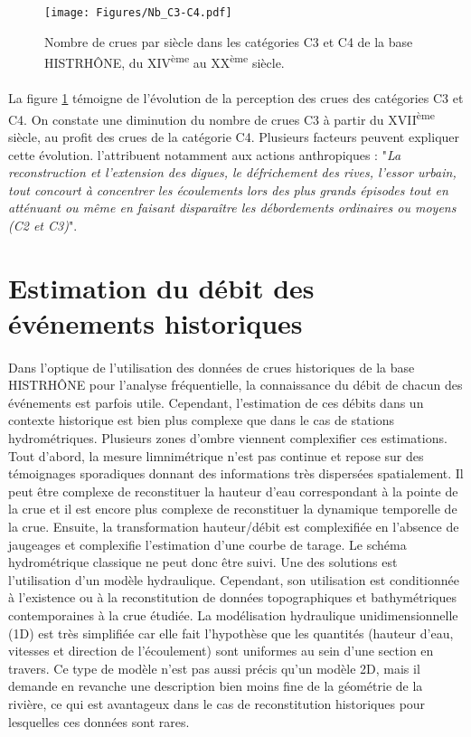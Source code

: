 \documentclass[11pt]{article}
\begin{document}
	\begin{figure}[h]
	\centering
		\texttt{[image: Figures/Nb\_C3-C4.pdf]}
        \caption{Nombre de crues par siècle dans les catégories C3 et C4 de la base HISTRHÔNE, du XIV\textsuperscript{ème} au XX\textsuperscript{ème} siècle.}
		\label{fig:Nb_C3C4}
	\end{figure}	
	
	\paragraph{} La figure \ref{fig:Nb_C3C4} témoigne de l'évolution de la perception des crues des catégories C3 et C4. On constate une diminution du nombre de crues C3 à partir du XVII\textsuperscript{ème} siècle, au profit des crues de la catégorie C4. Plusieurs facteurs peuvent expliquer cette évolution. \citet{pichard_sept_2014} l'attribuent notamment aux actions anthropiques : "\textit{La reconstruction et l'extension des digues, le défrichement des rives, l'essor urbain, tout concourt à concentrer les écoulements lors des plus grands épisodes tout en atténuant ou même en faisant disparaître les débordements ordinaires ou moyens (C2 et C3)}".
	

\section{Estimation du débit des événements historiques}

	\paragraph{} Dans l'optique de l'utilisation des données de crues historiques de la base HISTRHÔNE pour l'analyse fréquentielle, la connaissance du débit de chacun des événements est parfois utile. Cependant, l'estimation de ces débits dans un contexte historique est bien plus complexe que dans le cas de stations hydrométriques. Plusieurs zones d'ombre viennent complexifier ces estimations. Tout d'abord, la mesure limnimétrique n'est pas continue et repose sur des témoignages sporadiques donnant des informations très dispersées spatialement. Il peut être complexe de reconstituer la hauteur d'eau correspondant à la pointe de la crue et il est encore plus complexe de reconstituer la dynamique temporelle de la crue. Ensuite, la transformation hauteur/débit est complexifiée en l'absence de jaugeages et complexifie l'estimation d'une courbe de tarage. Le schéma hydrométrique classique ne peut donc être suivi. Une des solutions est l'utilisation d'un modèle hydraulique. Cependant, son utilisation est conditionnée à l'existence ou à la reconstitution de données topographiques et bathymétriques contemporaines à la crue étudiée. La modélisation hydraulique unidimensionnelle (1D) est très simplifiée car elle fait l'hypothèse que les quantités (hauteur d'eau, vitesses et direction de l'écoulement) sont uniformes au sein d'une section en travers. Ce type de modèle n'est pas aussi précis qu'un modèle 2D, mais il demande en revanche une description bien moins fine de la géométrie de la rivière, ce qui est avantageux dans le cas de reconstitution historiques pour lesquelles ces données sont rares. 
	
\end{document}
